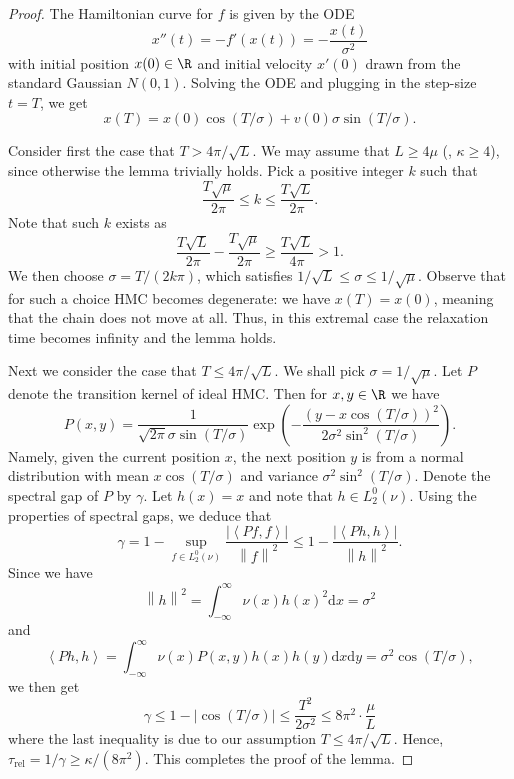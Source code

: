 \documentclass{toc}
\newcommand{\dif}{\mathrm{d}}
\newcommand{\norm}[1]{\left\lVert #1 \right\rVert}
\newcommand{\ip}[2]{\left\langle #1 , #2 \right\rangle}
\newcommand{\Trel}{\tau_{\mathrm{rel}}}
\begin{document}
\begin{proof}
	The Hamiltonian curve for $f$ is given by the ODE
	\[
	x''(t) = - f'(x(t)) = -\frac{x(t)}{\sigma^2}
	\]
	with initial position $x(0) \in \R$ and initial velocity $x'(0)$ drawn from the standard Gaussian $N(0,1)$. 
%
%
%
%
	Solving the ODE and plugging in the step-size $t=T$, we get
	\[
	x(T) = x(0) \cos(T/\sigma) + v(0) \sigma \sin(T/\sigma).
	\]
	
	Consider first the case that $T > 4\pi/\sqrt{L}$. 
	We may assume that $L \ge 4\mu$ (\ie, $\kappa \ge 4$), since otherwise the lemma trivially holds. 
	Pick a positive integer $k$ such that
	\[
	\frac{T\sqrt{\mu}}{2\pi} \le k \le \frac{T\sqrt{L}}{2\pi}.
	\]
	Note that such $k$ exists as
	\[
	\frac{T\sqrt{L}}{2\pi} - \frac{T\sqrt{\mu}}{2\pi} \ge \frac{T\sqrt{L}}{4\pi} > 1.
	\]
	We then choose
	$\sigma = T/(2k\pi)$, 
	which satisfies $1/\sqrt{L} \le \sigma \le 1/\sqrt{\mu}$. 
	Observe that for such a choice HMC becomes degenerate: we have $x(T) = x(0)$, meaning that the chain does not move at all. 
	Thus, in this extremal case the relaxation time becomes infinity and the lemma holds.
	
	Next we consider the case that $T \le 4\pi/\sqrt{L}$.
	We shall pick $\sigma = 1/\sqrt{\mu}$. 
	Let $P$ denote the transition kernel of ideal HMC. 
	Then for $x,y\in\R$ we have
	\[
	P(x,y) = \frac{1}{\sqrt{2\pi} \sigma \sin(T/\sigma)} \exp\left( - \frac{\left( y - x\cos(T/\sigma) \right)^2}{2\sigma^2 \sin^2(T/\sigma)} \right).
	\] 
	Namely, given the current position $x$, the next position $y$ is from a normal distribution with mean $x\cos(T/\sigma)$ and variance $\sigma^2 \sin^2(T/\sigma)$. 
	Denote the spectral gap of $P$ by $\gamma$. 
	Let $h(x) = x$ and note that $h\in L^0_2(\nu)$. Using the properties of spectral gaps, we deduce that
	\[
	\gamma 
	= 1 - \sup_{f\in L_2^0(\nu)} \frac{|\ip{P f}{f}|}{\norm{f}^2}
	\le 1 - \frac{|\ip{P h}{h}|}{\norm{h}^2}. 
	\]
	Since we have
	\[
	\norm{h}^2 = \int_{-\infty}^{\infty} \nu(x) h(x)^2 \dif x = \sigma^2
	\]
	and
	\[
	\ip{P h}{h} = \int_{-\infty}^{\infty} \nu(x) P(x,y) h(x) h(y) \dif x \dif y = \sigma^2 \cos(T/\sigma),
	\]
	we then get 
	\[
	\gamma \le 1 - |\cos(T/\sigma)| 
	\le \frac{T^2}{2\sigma^2} \le 8\pi^2 \cdot \frac{\mu}{L}
	\]
	where the last inequality is due to our assumption $T \le 4\pi/\sqrt{L}$. 
	Hence, $\Trel = 1/\gamma \ge \kappa/(8\pi^2)$. 
	This completes the proof of the lemma. 
\end{proof}

%
%
%
%
%
%
%
%
%
%
%
%
%
%
%
%
%
%
%
%
%
%
%
%
%
%
%
%
%
%
%
%
%
%
%
%
%
%
%
%
%
%
%
%
%
%
%
%
%
%
%
%
%
%
%
%
%
%
%
%
%
%
%
%
%
%
%
%
%
%
%
%
%
%
%
%
%
%
%
%
%
%
%
%
%
%
%
\end{document}

